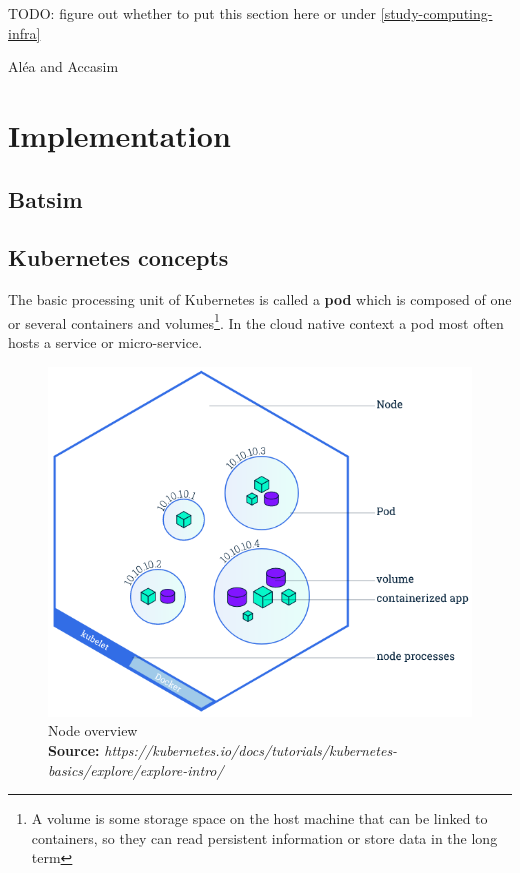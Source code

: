 \documentclass[12pt, a4paper]{memoir}
\newcommand*{\captionsource}[2]{%
    \caption[{#1}]{%
        #1%
        \\\hspace{\linewidth}%
	\textbf{Source:} \textit{#2}%
    }%
}
\begin{document}
TODO: figure out whether to put this section here or under \ref{study-computing-infra}

 Aléa and Accasim

\chapter{Implementation}

\section{Batsim}

\section{Kubernetes concepts}

The basic processing unit of Kubernetes is called a \textbf{pod} which is
composed of one or several containers and volumes\footnote{A volume is some
	storage space on the host machine that can be linked to containers, so
	they can read persistent information or store data in the long term}.
In the cloud native context a pod most often hosts a service or micro-service.

\begin{figure}[h]
	\centering
	\includegraphics[scale=0.5]{./imgs/node-overview.png}
	\captionsource{Node overview}{https://kubernetes.io/docs/tutorials/kubernetes-basics/explore/explore-intro/}
	\label{fig:node-overview}
\end{figure}
\end{document}
